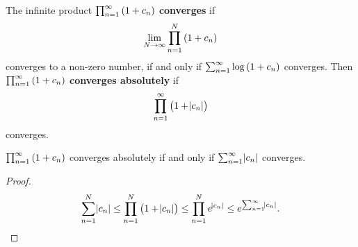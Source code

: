 \begin{definition}
The infinite product $ \prod_{n = 1}^\infty \br{1 + c_n} $ \textbf{converges} if
$$ \lim_{N \to \infty} \prod_{n = 1}^N \br{1 + c_n} $$
converges to a non-zero number, if and only if $ \sum_{n = 1}^\infty \log \br{1 + c_n} $ converges. Then $ \prod_{n = 1}^\infty \br{1 + c_n} $ \textbf{converges absolutely} if
$$ \prod_{n = 1}^\infty \br{1 + \abs{c_n}} $$
converges.
\end{definition}

\begin{lemma}
$ \prod_{n = 1}^\infty \br{1 + c_n} $ converges absolutely if and only if $ \sum_{n = 1}^\infty \abs{c_n} $ converges.
\end{lemma}

\begin{proof}
$$ \sum_{n = 1}^N \abs{c_n} \le \prod_{n = 1}^N \br{1 + \abs{c_n}} \le \prod_{n = 1}^N e^{\abs{c_n}} \le e^{\sum_{n = 1}^\infty \abs{c_n}}. $$
\end{proof}

\pagebreak


